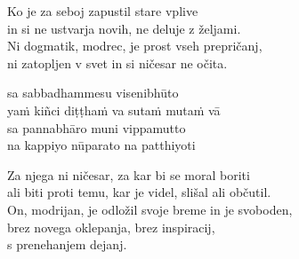 Ko je za seboj zapustil stare vplive\\
in si ne ustvarja novih, ne deluje z željami.\\
Ni dogmatik, modrec, je prost vseh prepričanj,\\
ni zatopljen v svet in si ničesar ne očita.


\clearpage

sa sabbadhammesu visenibhūto\\
yaṁ kiñci diṭṭhaṁ va sutaṁ mutaṁ vā\\
sa pannabhāro muni vippamutto\\
na kappiyo nūparato na patthiyoti


\clearpage

Za njega ni ničesar, za kar bi se moral boriti\\
ali biti proti temu, kar je videl, slišal ali občutil.\\
On, modrijan, je odložil svoje breme in je svoboden,\\
brez novega oklepanja, brez inspiracij,\\\vin s prenehanjem dejanj.

